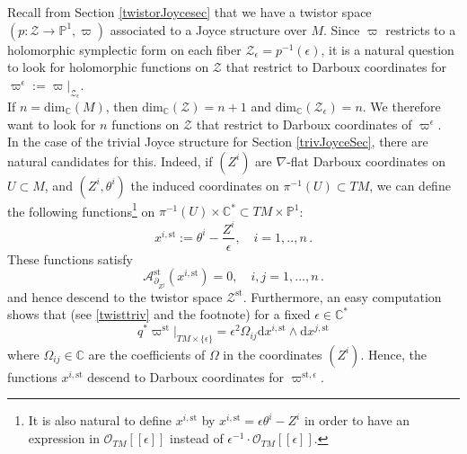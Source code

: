 \documentclass{article}
\theoremstyle{definition}
\numberwithin{equation}{section}
\begin{document}
Recall from Section \ref{twistorJoycesec} that we have a twistor space $(p:\mathcal{Z}\to \mathbb{P}^1, \varpi)$ associated to a Joyce structure over $M$. Since $\varpi$ restricts to a holomorphic symplectic form on each fiber $\mathcal{Z}_{\epsilon}=p^{-1}(\epsilon)$, it is a natural question to look for holomorphic functions on $\mathcal{Z}$ that restrict to Darboux coordinates for $\varpi^{\epsilon}:=\varpi|_{\mathcal{Z}_{\epsilon}}$.\\

If $n = \text{dim}_{\mathbb{C}}(M)$, then   $\text{dim}_{\mathbb{C}}(\mathcal{Z})=n+1$ and $\text{dim}_{\mathbb{C}}(\mathcal{Z}_{\epsilon})=n$. We therefore want to look for $n$ functions on $\mathcal{Z}$ that restrict to Darboux coordinates of $\varpi^{\epsilon}$.\\

In the case of the trivial Joyce structure for Section \ref{trivJoyceSec}, there are natural candidates for this. Indeed, if $(Z^i)$ are $\nabla$-flat Darboux coordinates on $U\subset M$, and $(Z^i,\theta^i)$ the induced coordinates on $\pi^{-1}(U)\subset TM$, we can define the following functions\footnote{It is also natural to define $x^{i,\text{st}}$ by $x^{i,\text{st}}=\epsilon \theta^i-Z^i$ in order to have an expression in $\mathcal{O}_{TM}[[\epsilon]]$ instead of $\epsilon^{-1}\cdot \mathcal{O}_{TM}[[\epsilon]]$.} on $\pi^{-1}(U)\times \mathbb{C}^{*}\subset TM\times \mathbb{P}^1$:
\begin{equation}\label{stcoords}
    x^{i,\text{st}}:=\theta^i-\frac{Z^i}{\epsilon}, \quad i=1,..,n\,.
\end{equation}
These functions satisfy
\begin{equation}
    \mathcal{A}^{\text{st}}_{\partial_{Z^j}}(x^{i,\text{st}})=0, \quad i,j=1,...,n\,.
\end{equation}
and hence descend to the twistor space $\mathcal{Z}^{\text{st}}$. Furthermore, an easy computation shows that (see \eqref{twisttriv} and the footnote) for a fixed $\epsilon \in \mathbb{C}^{*}$
\begin{equation}\label{trivtwistdarboux}
    q^*\varpi^{\text{st}}|_{TM\times \{\epsilon\}}=\epsilon^{2}\Omega_{ij}\mathrm{d}x^{i,\text{st}}\wedge \mathrm{d}x^{j,\text{st}}
\end{equation}
where $\Omega_{ij}\in \mathbb{C}$ are the coefficients of $\Omega$ in the coordinates $(Z^i)$. Hence, the functions $x^{i,\text{st}}$ descend to Darboux coordinates for $\varpi^{\text{st},\epsilon}$.\\
\end{document}
